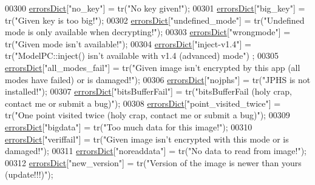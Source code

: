 \begin{DoxyCode}
00300     \hyperlink{class_view_p_c_aaf7f058e5589d65fec72a21abfd5629b}{errorsDict}[\textcolor{stringliteral}{"no\_key"}] = tr(\textcolor{stringliteral}{"No key given!"});
00301     \hyperlink{class_view_p_c_aaf7f058e5589d65fec72a21abfd5629b}{errorsDict}[\textcolor{stringliteral}{"big\_key"}] = tr(\textcolor{stringliteral}{"Given key is too big!"});
00302     \hyperlink{class_view_p_c_aaf7f058e5589d65fec72a21abfd5629b}{errorsDict}[\textcolor{stringliteral}{"undefined\_mode"}] = tr(\textcolor{stringliteral}{"Undefined mode is only available when decrypting!"});
00303     \hyperlink{class_view_p_c_aaf7f058e5589d65fec72a21abfd5629b}{errorsDict}[\textcolor{stringliteral}{"wrongmode"}] = tr(\textcolor{stringliteral}{"Given mode isn't available!"});
00304     \hyperlink{class_view_p_c_aaf7f058e5589d65fec72a21abfd5629b}{errorsDict}[\textcolor{stringliteral}{"inject-v1.4"}] = tr(\textcolor{stringliteral}{"ModelPC::inject() isn't available with v1.4 (advanced) mode"})
      ;
00305     \hyperlink{class_view_p_c_aaf7f058e5589d65fec72a21abfd5629b}{errorsDict}[\textcolor{stringliteral}{"all\_modes\_fail"}] = tr(\textcolor{stringliteral}{"Given image isn't encrypted by this app (all modes have
       failed) or is damaged!"});
00306     \hyperlink{class_view_p_c_aaf7f058e5589d65fec72a21abfd5629b}{errorsDict}[\textcolor{stringliteral}{"nojphs"}] = tr(\textcolor{stringliteral}{"JPHS is not installed!"});
00307     \hyperlink{class_view_p_c_aaf7f058e5589d65fec72a21abfd5629b}{errorsDict}[\textcolor{stringliteral}{"bitsBufferFail"}] = tr(\textcolor{stringliteral}{"bitsBufferFail (holy crap, contact me or submit a bug)"});
00308     \hyperlink{class_view_p_c_aaf7f058e5589d65fec72a21abfd5629b}{errorsDict}[\textcolor{stringliteral}{"point\_visited\_twice"}] = tr(\textcolor{stringliteral}{"One point visited twice (holy crap, contact me or
       submit a bug)"});
00309     \hyperlink{class_view_p_c_aaf7f058e5589d65fec72a21abfd5629b}{errorsDict}[\textcolor{stringliteral}{"bigdata"}] = tr(\textcolor{stringliteral}{"Too much data for this image!"});
00310     \hyperlink{class_view_p_c_aaf7f058e5589d65fec72a21abfd5629b}{errorsDict}[\textcolor{stringliteral}{"veriffail"}] = tr(\textcolor{stringliteral}{"Given image isn't encrypted with this mode or is damaged!"});
00311     \hyperlink{class_view_p_c_aaf7f058e5589d65fec72a21abfd5629b}{errorsDict}[\textcolor{stringliteral}{"noreaddata"}] = tr(\textcolor{stringliteral}{"No data to read from image!"});
00312     \hyperlink{class_view_p_c_aaf7f058e5589d65fec72a21abfd5629b}{errorsDict}[\textcolor{stringliteral}{"new\_version"}] = tr(\textcolor{stringliteral}{"Version of the image is newer than yours (update!!!)"});

\end{DoxyCode}

